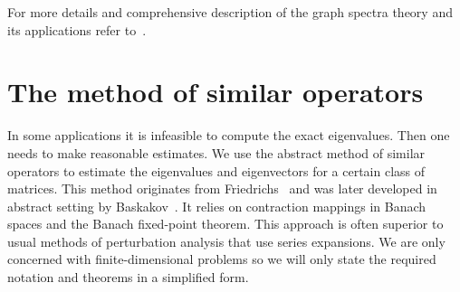 \documentclass[a4paper]{jpconf}
\begin{document}
For more details and comprehensive description
    of the graph spectra theory
    and its applications
    refer to~\cite{cvetkovic1980spectra,cvetkovic2010introduction,godsil2013algebraic}.

\section{The method of similar operators}

In some applications
    it is infeasible to compute the exact eigenvalues.
Then one needs to make reasonable estimates.
We use the abstract method of similar operators
    to estimate the eigenvalues and eigenvectors
    for a certain class of matrices.
This method originates from Friedrichs~\cite{friedrichs1965advanced}
    and was later developed in abstract setting
    by Baskakov~\cite{baskakov1983methods,baskakov2017method,baskakov2013completeness}.
It relies on contraction mappings in Banach spaces
    and the Banach fixed-point theorem.
This approach is often superior to usual methods of perturbation analysis
    that use series expansions.
We are only concerned with finite-dimensional problems
    so we will only state the required notation and theorems
    in a simplified form.
\end{document}
